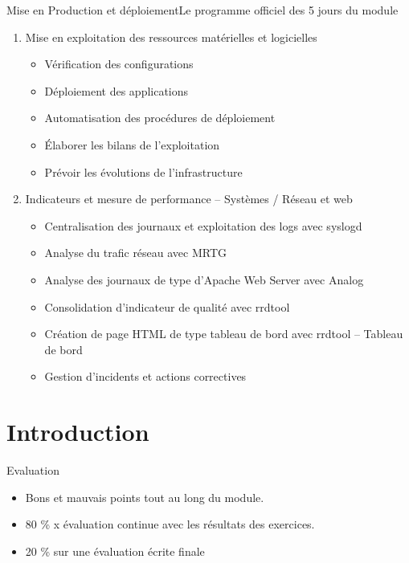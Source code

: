 \documentclass{beamer}
\begin{document}
    \begin{frame}{Mise en Production et déploiement}{Le programme officiel des 5 jours du module}
        \begin{enumerate}
            \item Mise en exploitation des ressources matérielles et logicielles
            \begin{itemize}
                \fontsize{8pt}{8pt}\selectfont
                \item Vérification des configurations
                \item Déploiement des applications
                \item Automatisation des procédures de déploiement
                \item Élaborer les bilans de l’exploitation
                \item Prévoir les évolutions de l’infrastructure
            \end{itemize}
            \item Indicateurs et mesure de performance – Systèmes / Réseau et web
            \begin{itemize}
                \fontsize{8pt}{8pt}\selectfont
                \item Centralisation des journaux et exploitation des logs avec syslogd
                \item Analyse du trafic réseau avec MRTG
                \item Analyse des journaux de type d'Apache Web Server avec Analog
                \item Consolidation d'indicateur de qualité avec rrdtool
                \item Création de page HTML de type tableau de bord avec rrdtool – Tableau de bord
                \item Gestion d’incidents et actions correctives
            \end{itemize}
        \end{enumerate}
    \end{frame}


    \section{Introduction}\label{sec:introduction}

    \begin{frame}{Evaluation}
        \begin{itemize}
            \item Bons et mauvais points tout au long du module.
            \item 80 \% x évaluation continue avec les résultats des exercices.
            \item 20 \% sur une évaluation écrite finale
        \end{itemize}
    \end{frame}
\end{document}
